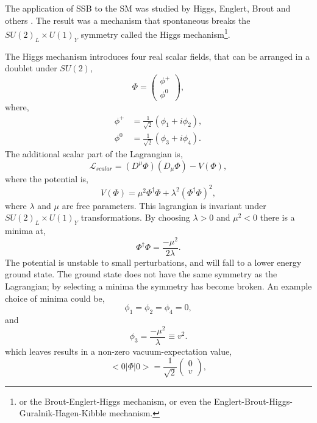 The application of {SSB} to the {SM} was studied by Higgs, Englert, Brout
and others \cite{higgs1981broken, englert1964broken, guralnik1964global}.
The result was a mechanism that spontaneous breaks the
 $SU(2)_{L} \times U(1)_{Y}$ symmetry called the Higgs mechanism\footnote{or the
Brout-Englert-Higgs mechanism, or even the
Englert-Brout-Higgs-Guralnik-Hagen-Kibble mechanism.}.

The Higgs mechanism introduces four real scalar fields, that can be arranged in a
doublet under $SU(2)$,
\begin{equation}
\Phi = \left( \begin{matrix} \phi^{+} \\ \phi^{0} \end{matrix} \right),
\end{equation}
where,
\begin{align*}
\phi^{+} &=\frac{1}{\sqrt{2}} (\phi_{1} + i \phi_{2}),\\
\phi^{0} &=\frac{1}{\sqrt{2}} (\phi_{3} + i \phi_{4}).
\end{align*}
The additional scalar part of the Lagrangian is,
\begin{equation}
\mathcal{L}_{scalar} = 
\left(D^{\mu}\Phi\right) \left(D_{\mu}\Phi\right) - V(\Phi),
\end{equation}
where the potential is,
\begin{equation}
V(\Phi) = 
\mu^{2}\Phi^{\dagger}\Phi + 
\lambda^{2} \left( \Phi^{\dagger} \Phi \right)^{2},
\end{equation}
where $\lambda$ and $\mu$ are free parameters. This lagrangian is invariant
under $SU(2)_{L} \times U(1)_{Y}$ transformations.
By choosing  $\lambda>0$ and
$\mu^{2}<0$ there is a minima at,
\begin{equation}
\Phi^{\dagger} \Phi = \frac{- \mu^{2}}{2 \lambda}.
\end{equation}
The potential is unstable to small perturbations, and will fall
to a lower energy ground state. 
The ground state does not have the same symmetry as the Lagrangian; by
selecting a minima the symmetry has become broken. An example choice of minima
could be,
\begin{equation}
\phi_{1} = \phi_{2} = \phi_{4} = 0,
\end{equation}
and
\begin{equation}
\phi_{3} = \frac{-\mu^{2}}{\lambda} \equiv v^{2}.
\end{equation}
which leaves results in a non-zero vacuum-expectation value,
\begin{equation}
<0|\Phi|0> = \frac{1}{\sqrt{2}}\left(\begin{matrix}0\\v\end{matrix}\right),
\end{equation}
